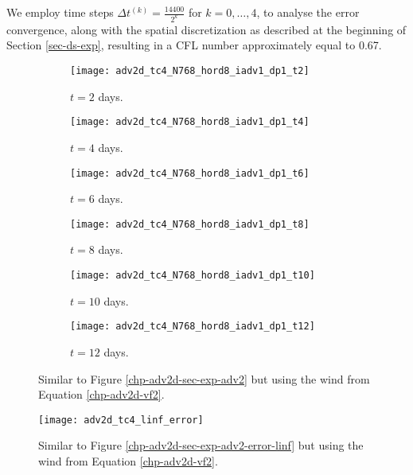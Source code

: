 We employ time steps $\Delta t^{(k)}=\frac{14400}{2^{k}}$ for 
$k = 0, \ldots, 4$, to analyse the error convergence, 
along with the spatial discretization as described at the beginning of Section \ref{sec-ds-exp},
resulting in a CFL number approximately equal to 0.67.
\begin{figure}[!htb]
	\centering
	\begin{subfigure}{0.25\textwidth}
		\centering
		\texttt{[image: adv2d\_tc4\_N768\_hord8\_iadv1\_dp1\_t2]}
		\caption{$t=2$ days.\label{chp-adv2d-sec-exp-adv3-a}}
	\end{subfigure}
	\begin{subfigure}{0.25\textwidth}
		\centering
		\texttt{[image: adv2d\_tc4\_N768\_hord8\_iadv1\_dp1\_t4]}
		\caption{$t=4$ days.\label{chp-adv2d-sec-exp-adv3-b}}
	\end{subfigure}
	\begin{subfigure}{0.25\textwidth}
		\centering
		\texttt{[image: adv2d\_tc4\_N768\_hord8\_iadv1\_dp1\_t6]}
		\caption{$t=6$ days.\label{chp-adv2d-sec-exp-adv3-c}}
	\end{subfigure}
	
	\begin{subfigure}{0.25\textwidth}
		\centering
		\texttt{[image: adv2d\_tc4\_N768\_hord8\_iadv1\_dp1\_t8]}
		\caption{$t=8$ days.\label{chp-adv2d-sec-exp-adv3-d}}
	\end{subfigure}
	\begin{subfigure}{0.25\textwidth}
		\centering
		\texttt{[image: adv2d\_tc4\_N768\_hord8\_iadv1\_dp1\_t10]}
		\caption{$t=10$ days.\label{chp-adv2d-sec-exp-adv3-e}}
	\end{subfigure}
	\begin{subfigure}{0.25\textwidth}
		\centering
		\texttt{[image: adv2d\_tc4\_N768\_hord8\_iadv1\_dp1\_t12]}
		\caption{$t=12$ days.\label{chp-adv2d-sec-exp-adv3-f}}
	\end{subfigure}
\caption{Similar to Figure \ref{chp-adv2d-sec-exp-adv2}
but using the wind from Equation \eqref{chp-adv2d-vf2}.\label{chp-adv2d-sec-exp-adv3}}
\end{figure}


\begin{figure}[!htb]
\centering
\texttt{[image: adv2d\_tc4\_linf\_error]}
\caption{Similar to Figure \ref{chp-adv2d-sec-exp-adv2-error-linf}
but using the wind from Equation \eqref{chp-adv2d-vf2}.\label{chp-adv2d-sec-exp-adv3-error-linf}}
\end{figure}


